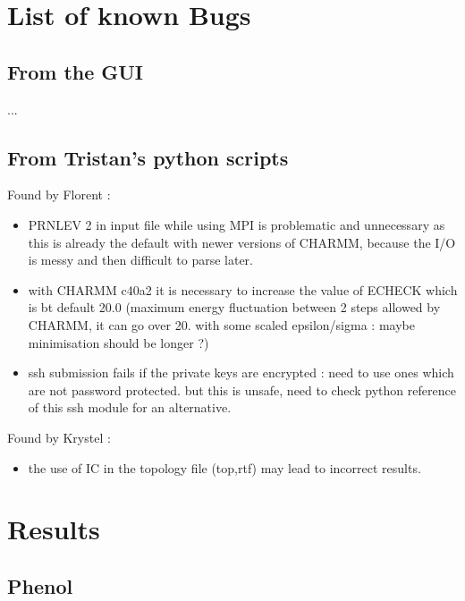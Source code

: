 \documentclass[12pt,a4paper]{article}
\begin{document}

\section{List of known Bugs}

\subsection{From the GUI}

...

\subsection{From Tristan's python scripts}

Found by Florent :
\begin{itemize}
\item PRNLEV 2 in input file while using MPI is problematic and unnecessary as this is already the 
default with newer versions of CHARMM, because the I/O is messy and then difficult to parse later.
\item with CHARMM c40a2 it is necessary to increase the value of ECHECK which is bt default 20.0 
(maximum energy fluctuation between 2 steps allowed by CHARMM, it can go over 20. with some scaled 
epsilon/sigma : maybe minimisation should be longer ?)
\item ssh submission fails if the private keys are encrypted : need to use ones which are not 
password protected. but this is unsafe, need to check python reference of this ssh module for an 
alternative. 
\end{itemize}

Found by Krystel : 
\begin{itemize}
\item the use of IC in the topology file (top,rtf) may lead to incorrect results.
\end{itemize}


\section{Results}

\subsection{Phenol}
\end{document}
